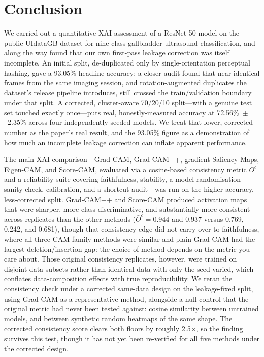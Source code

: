 \section{Conclusion}

We carried out a quantitative XAI assessment of a ResNet-50 model on the public UIdataGB dataset for nine-class gallbladder ultrasound classification, and along the way found that our own first-pass leakage correction was itself incomplete. An initial split, de-duplicated only by single-orientation perceptual hashing, gave a 93.05\% headline accuracy; a closer audit found that near-identical frames from the same imaging session, and rotation-augmented duplicates the dataset's release pipeline introduces, still crossed the train/validation boundary under that split. A corrected, cluster-aware 70/20/10 split---with a genuine test set touched exactly once---puts real, honestly-measured accuracy at 72.56\%~$\pm$~2.35\% across four independently seeded models. We treat that lower, corrected number as the paper's real result, and the 93.05\% figure as a demonstration of how much an incomplete leakage correction can inflate apparent performance.

The main XAI comparison---Grad-CAM, Grad-CAM++, gradient Saliency Maps, Eigen-CAM, and Score-CAM, evaluated via a cosine-based consistency metric $O^c$ and a reliability suite covering faithfulness, stability, a model-randomisation sanity check, calibration, and a shortcut audit---was run on the higher-accuracy, less-corrected split. Grad-CAM++ and Score-CAM produced activation maps that were sharper, more class-discriminative, and substantially more consistent across replicates than the other methods ($\bar{O}^c=0.944$ and $0.937$ versus 0.769, 0.242, and 0.681), though that consistency edge did not carry over to faithfulness, where all three CAM-family methods were similar and plain Grad-CAM had the largest deletion/insertion gap: the choice of method depends on the metric you care about. Those original consistency replicates, however, were trained on disjoint data subsets rather than identical data with only the seed varied, which conflates data-composition effects with true reproducibility. We reran the consistency check under a corrected same-data design on the leakage-fixed split, using Grad-CAM as a representative method, alongside a null control that the original metric had never been tested against: cosine similarity between untrained models, and between synthetic random heatmaps of the same shape. The corrected consistency score clears both floors by roughly 2.5$\times$, so the finding survives this test, though it has not yet been re-verified for all five methods under the corrected design.

